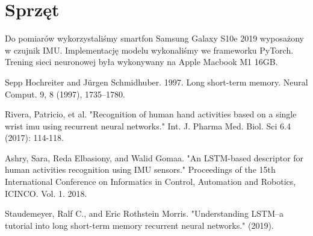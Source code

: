 \documentclass[10pt]{article}
\begin{document}
\section{Sprzęt}

Do pomiarów wykorzystaliśmy smartfon Samsung Galaxy S10e 2019 wyposażony w czujnik IMU. Implementację modelu wykonaliśmy we frameworku PyTorch. Trening sieci neuronowej była wykonywany na Apple Macbook M1 16GB.

\begin{thebibliography}{9}
  
  \bibitem{}
  Sepp Hochreiter and Jürgen Schmidhuber. 1997. Long short-term memory. Neural Comput. 9, 8 (1997), 1735–1780.

  \bibitem{}
  Rivera, Patricio, et al. "Recognition of human hand activities based on a single wrist imu using recurrent neural networks." Int. J. Pharma Med. Biol. Sci 6.4 (2017): 114-118.
  
  \bibitem{}
  Ashry, Sara, Reda Elbasiony, and Walid Gomaa. "An LSTM-based descriptor for human activities recognition using IMU sensors." Proceedings of the 15th International Conference on Informatics in Control, Automation and Robotics, ICINCO. Vol. 1. 2018.

  \bibitem{}
  Staudemeyer, Ralf C., and Eric Rothstein Morris. "Understanding LSTM--a tutorial into long short-term memory recurrent neural networks." (2019).
\end{thebibliography}
\end{document}

